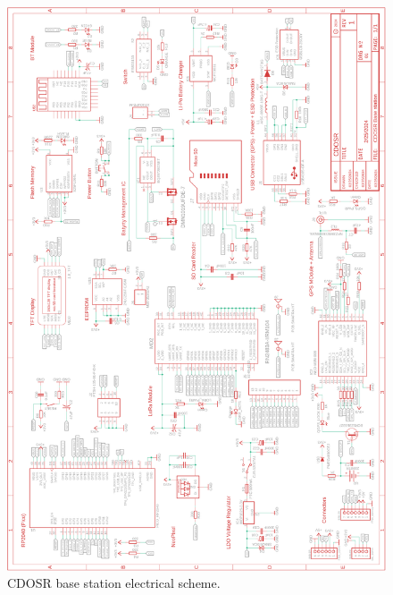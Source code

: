 \documentclass[11pt]{article}
\begin{document}
\begin{figure}[h]
    \centering
    \includegraphics[width=11.4cm]{images/base_station3.png}
    \caption{\small{CDOSR base station electrical scheme.}}
\end{figure}
    

\newpage




\newpage
\end{document}
